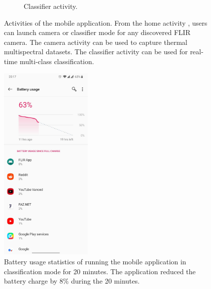 \documentclass{l4proj}
\begin{document}
\begin{appendices}
\begin{figure}[ht]
\begin{subfigure}[h!]{0.32\textwidth}
    \caption{Classifier activity.}
    \label{fig:app_activities_classifier}
  \end{subfigure}
  \caption{Activities of the mobile application. From the home activity , users can launch camera or classifier mode for any discovered FLIR camera. The camera activity  can be used to capture thermal multispectral datasets. The classifier activity  can be used for real-time multi-class classification.}
  \label{fig:app_activities}
\end{figure}

\begin{figure}[ht]
  \centering
  \includegraphics[width=0.4\textwidth, trim={0cm 32cm 0cm 0cm}, clip]{images/app/battery}
  \caption{Battery usage statistics of running the mobile application in classification mode for 20 minutes. The application reduced the battery charge by $8\%$ during the 20 minutes.}
  \label{fig:app_battery}
\end{figure}


\end{appendices}






\end{document}
